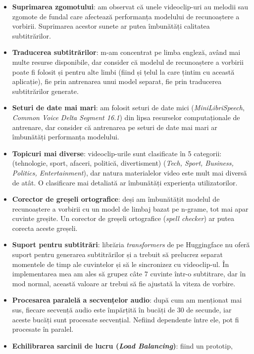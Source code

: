 \begin{itemize}
    \item \textbf{Suprimarea zgomotului}: am observat că unele videoclip-uri au melodii sau 
    zgomote de fundal care afectează performanța modelului de recunoaștere a vorbirii. Suprimarea
    acestor sunete ar putea îmbunătăți calitatea subtitrărilor.
    \item \textbf{Traducerea subtitrărilor}: m-am concentrat pe limba engleză, având mai multe
    resurse disponibile, dar consider că modelul de recunoaștere a vorbirii poate fi folosit
    și pentru alte limbi (fiind și țelul la care țintim cu această aplicație), fie prin antrenarea
    unui model separat, fie prin traducerea subtitrărilor generate.
    \item \textbf{Seturi de date mai mari}: am folosit seturi de date mici (\textit{MiniLibriSpeech},
    \textit{Common Voice Delta Segment 16.1}) din lipsa resurselor computaționale de antrenare,
    dar consider că antrenarea pe seturi de date mai mari ar îmbunătăți performanța modelului.
    \item \textbf{Topicuri mai diverse}: videoclip-urile sunt clasificate în 5 categorii:
    (tehnologie, sport, afaceri, politică, divertisment) (\textit{Tech, Sport, Business, Politics, Entertainment}),
    dar natura materialelor video este mult mai diversă de atât. O clasificare mai detaliată ar
    îmbunătăți experiența utilizatorilor.
    \item \textbf{Corector de greșeli ortografice}: deși am îmbunătățit modelul de recunoaștere a vorbirii
    cu un model de limbaj bazat pe n-grame, tot mai apar cuvinte greșite. Un corector de greșeli ortografice
    (\textit{spell checker}) ar putea corecta aceste greșeli.
    \item \textbf{Suport pentru subtitrări}: librăria \textit{transformers} de pe Huggingface nu oferă
    suport pentru generarea subtitrărilor și a trebuit să prelucrez separat momentele de timp
    ale cuvintelor și să le sincronizez cu videoclip-ul. În implementarea mea am ales să grupez
    câte 7 cuvinte într-o subtitrare, dar în mod normal, această valoare ar trebui să fie ajustată
    la viteza de vorbire.
    \item \textbf{Procesarea paralelă a secvențelor audio}: după cum am menționat mai sus,
    fiecare secvență audio este împărțită în bucăți de 30 de secunde, iar aceste bucăți sunt
    procesate secvențial. Nefiind dependente între ele, pot fi procesate în paralel.
    \item \textbf{Echilibrarea sarcinii de lucru (\textit{Load Balancing})}: fiind un prototip,

\end{itemize}
